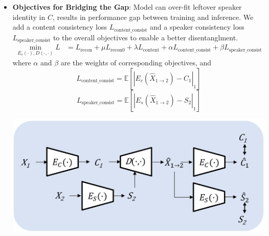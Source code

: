 \documentclass[20pt,margin=1in,innermargin=-4.5in,blockverticalspace=-0.25in]{tikzposter}
\begin{document}
\begin{columns}
{\begin{itemize}
			\item \textbf{Objectives for Bridging the Gap}: Model can over-fit leftover speaker identity in $C$, results in performance gap between training and inference. We add a content consistency loss $L_{\text{content\_consist}}$ and a speaker consistency loss $L_{\text{speaker\_consist}}$ to the overall objectives to enable a better disentanglment.
			\begin{align*}
                \min_{E_{c}(\cdot), D(\cdot,\cdot)} L & = L_{\text{recon}} + \mu L_{\text{recon0}} + \lambda L_{\text{content}} + \alpha L_{\text{content\_consist}} + \beta L_{\text{speaker\_consist}}
            \end{align*}
            where $\alpha$ and $\beta$ are the weights of corresponding objectives, and
            \[L_{\text{content\_consist}} = \mathbb{E}\left[\left\lvert E_{c} (\hat{X}_{1\rightarrow 2}) - C_{1}\right\rvert_{1}\right]\]
            \[L_{\text{speaker\_consist}} = \mathbb{E}\left[\left\lvert E_{s} (\hat{X}_{1\rightarrow 2}) - S_{2}\right\rvert_{1}\right]\]
            \begin{tikzfigure}
     			\includegraphics[scale=0.35]{./training_pipeline_DEIDVC.png}
     	    \end{tikzfigure}
     	    

\end{itemize}}
\end{columns}
\end{document}
